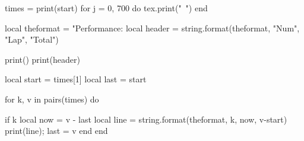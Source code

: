 \documentclass[a4paper]{article}
\begin{document}
\begin{luacode*}

  times = {}
  print(start)
  for j = 0, 700 do
     tex.print("\ ")
  end

\end{luacode*}


\begin{luacode}

  local theformat = "Performance: %
  local header = string.format(theformat, "Num", "Lap", "Total")

  print()
  print(header)

  local start = times[1]
  local last = start

  for k, v in pairs(times) do

  if k %
     local now = v - last
     local line = string.format(theformat, k, now, v-start)
     print(line); last = v
  end
  end

\end{luacode}
\end{document}
